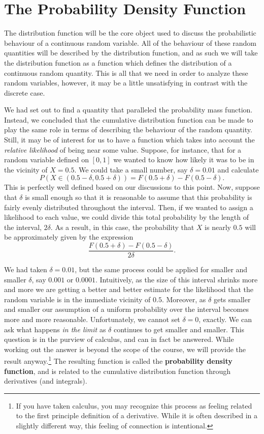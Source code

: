 \documentclass[
  letterpaper,
  DIV=11,
  numbers=noendperiod]{scrreprt}
\theoremstyle{definition}
\theoremstyle{definition}
\theoremstyle{definition}
\theoremstyle{remark}
\begin{document}
\section{The Probability Density
Function}\label{the-probability-density-function}

The distribution function will be the core object used to discuss the
probabilistic behaviour of a continuous random variable. All of the
behaviour of these random quantities will be described by the
distribution function, and as such we will take the distribution
function as a function which defines the distribution of a continuous
random quantity. This is all that we need in order to analyze these
random variables, however, it may be a little unsatisfying in contrast
with the discrete case.

We had set out to find a quantity that paralleled the probability mass
function. Instead, we concluded that the cumulative distribution
function can be made to play the same role in terms of describing the
behaviour of the random quantity. Still, it may be of interest for us to
have a function which takes into account the \emph{relative likelihood}
of being near some value. Suppose, for instance, that for a random
variable defined on \([0,1]\) we wanted to know how likely it was to be
in the vicinity of \(X=0.5\). We could take a small number, say
\(\delta = 0.01\) and calculate
\[P(X\in(0.5-\delta,0.5+\delta)) = F(0.5+\delta)-F(0.5-\delta).\] This
is perfectly well defined based on our discussions to this point. Now,
suppose that \(\delta\) is small enough so that it is reasonable to
assume that this probability is fairly evenly distributed throughout the
interval. Then, if we wanted to assign a likelihood to each value, we
could divide this total probability by the length of the interval,
\(2\delta\). As a result, in this case, the probability that \(X\) is
nearly \(0.5\) will be approximately given by the expression
\[\dfrac{F(0.5+\delta)-F(0.5-\delta)}{2\delta}.\]

We had taken \(\delta=0.01\), but the same process could be applied for
smaller and smaller \(\delta\), say \(0.001\) or \(0.0001\).
Intuitively, as the size of this interval shrinks more and more we are
getting a better and better estimate for the likelihood that the random
variable is in the immediate vicinity of \(0.5\). Moreover, as
\(\delta\) gets smaller and smaller our assumption of a uniform
probability over the interval becomes more and more reasonable.
Unfortunately, we cannot set \(\delta=0\), exactly. We can ask what
happens \emph{in the limit} as \(\delta\) continues to get smaller and
smaller. This question is in the purview of calculus, and can in fact be
answered. While working out the answer is beyond the scope of the
course, we will provide the result anyway.\footnote{If you have taken
  calculus, you may recognize this process as feeling related to the
  first principle definition of a derivative. While it is often
  described in a slightly different way, this feeling of connection is
  intentional.} The resulting function is called the \textbf{probability
density function}, and is related to the cumulative distribution
function through derivatives (and integrals).
\end{document}
